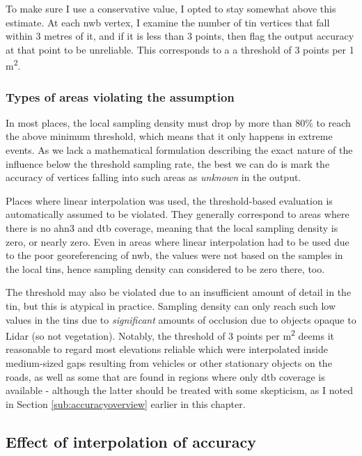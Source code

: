 To make sure I use a conservative value, I opted to stay somewhat above this estimate. At each \ac{nwb} vertex, I examine the number of \ac{tin} vertices that fall within 3 metres of it, and if it is less than 3 points, then flag the output accuracy at that point to be unreliable. This corresponds to a a threshold of 3 points per 1 m\textsuperscript{2}.

\subsubsection{Types of areas violating the assumption}

In most places, the local sampling density must drop by more than 80\% to reach the above minimum threshold, which means that it only happens in extreme events. As we lack a mathematical formulation describing the exact nature of the influence below the threshold sampling rate, the best we can do is mark the accuracy of vertices falling into such areas as \textit{unknown} in the output.

Places where linear interpolation was used, the threshold-based evaluation is automatically assumed to be violated. They generally correspond to areas where there is no \ac{ahn3} and \ac{dtb} coverage, meaning that the local sampling density is zero, or nearly zero. Even in areas where linear interpolation had to be used due to the poor georeferencing of \ac{nwb}, the values were not based on the samples in the local \ac{tin}s, hence sampling density can considered to be zero there, too.

The threshold may also be violated due to an insufficient amount of detail in the \ac{tin}, but this is atypical in practice. Sampling density can only reach such low values in the \ac{tin}s due to \textit{significant} amounts of occlusion due to objects opaque to Lidar (so not vegetation). Notably, the threshold of 3 points per m\textsuperscript{2} deems it reasonable to regard most elevations reliable which were interpolated inside medium-sized gaps resulting from vehicles or other stationary objects on the roads, as well as some that are found in regions where only \ac{dtb} coverage is available - although the latter should be treated with some skepticism, as I noted in Section \ref{sub:accuracyoverview} earlier in this chapter.

\subsection{Effect of interpolation of accuracy}
\label{sub:m_accuracyinterpolation}

